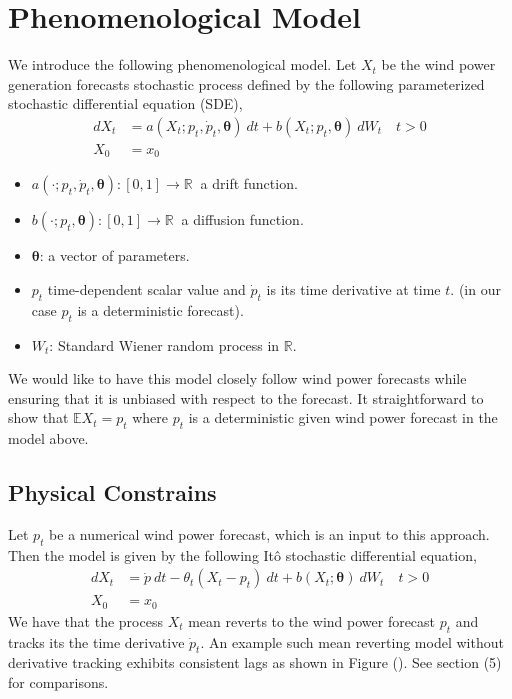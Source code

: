 \documentclass[10pt,twocolumn,letterpaper]{article}
\newcommand{\R}{\mathbb{R}}
\newcommand{\E}{\mathbb{E}}
\begin{document}
\section{Phenomenological  Model}
We introduce the following phenomenological model. Let $X_t$ be the  wind power generation forecasts stochastic process defined by the  following parameterized stochastic differential equation (SDE),
\begin{equation}
\begin{split}
dX_t &= a(X_t; p_t, \dot{p}_t,\bm{\theta}) \ dt + b (X_t;p_t, \bm{\theta} ) \ dW_t \quad t > 0 \\
X_0 & = x_0
\end{split}
\label{main}
\end{equation}

\begin{itemize}
\item $a(\cdot; p_t, \dot{p}_t,\bm{\theta}):[0,1] \to \R \ $  a drift function.
\item $b (\cdot;p_t, \bm{\theta} ):[0,1] \to \R \ $  a  diffusion function.
\item $\bm{\theta}$: a vector of parameters.
\item $p_t$ time-dependent scalar value and $ \dot{p}_t$ is its time derivative at time $t$. (in our case  $p_t$ is a deterministic forecast).
\item $W_t$: Standard Wiener random process in $\R$.
\end{itemize}

We would like to have this model closely follow wind power forecasts while ensuring that it is unbiased with respect to the forecast. It straightforward to show that $\E X_t = p_t$ where $p_t$ is a deterministic given wind power forecast in the model above.

\subsection{Physical Constrains}

Let $p_t$ be a numerical wind power forecast, which is an input to this approach. Then the model is given by the following It\^{o} stochastic differential equation,
\begin{equation}
\begin{split}
dX_t&= \dot{p} \ dt - \theta_t(X_t - p_t) \ dt + b (X_t; \bm{\theta} ) \ dW_t \quad t > 0 \\
X_0&=x_0
\end{split}
\label{model:derivative_tracking_X}
\end{equation}
We have that the process $X_t$ mean reverts to the wind power forecast $p_t$ and tracks its the time derivative $\dot{p}_t$.  An example such mean reverting model without derivative tracking exhibits consistent lags as shown in Figure (). See section (5) for comparisons.
\end{document}
